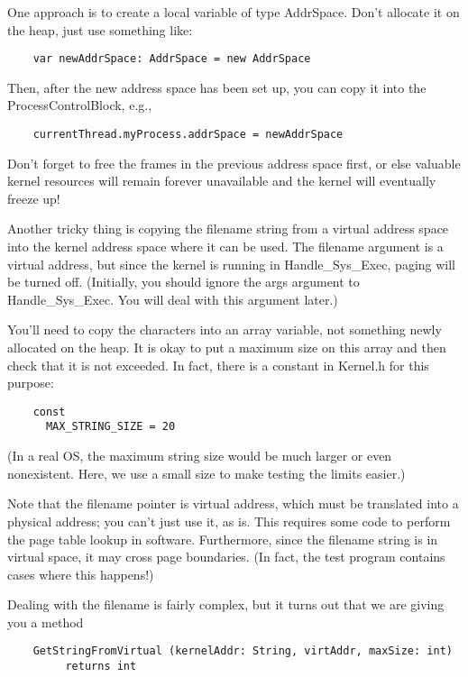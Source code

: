 \documentclass[12pt]{article}
\begin{document}
One approach is to create a local variable of type AddrSpace.  Don't
allocate it on the heap, just use something like:

\begin{verbatim}
    var newAddrSpace: AddrSpace = new AddrSpace
\end{verbatim}

Then, after the new address space has been set up, you can copy it
into the ProcessControlBlock, e.g.,

\begin{verbatim}
    currentThread.myProcess.addrSpace = newAddrSpace
\end{verbatim}

Don't forget to free the frames in the previous address space first,
or else valuable kernel resources will remain forever unavailable and
the kernel will eventually freeze up!

Another tricky thing is copying the filename string from a virtual
address space into the kernel address space where it can be used.  The
filename argument is a virtual address, but since the kernel is
running in Handle\_Sys\_Exec, paging will be turned off.  (Initially,
you should ignore the args argument to Handle\_Sys\_Exec.  You will
deal with this argument later.)

You'll need to copy the characters into an array variable, not
something newly allocated on the heap.  It is okay to put a maximum
size on this array and then check that it is not exceeded.  In fact,
there is a constant in Kernel.h for this purpose:

\begin{verbatim}
    const
      MAX_STRING_SIZE = 20
\end{verbatim}

(In a real OS, the maximum string size would be much larger or even
nonexistent.  Here, we use a small size to make testing the limits
easier.)

Note that the filename pointer is virtual address, which must be
translated into a physical address; you can't just use it, as is.
This requires some code to perform the page table lookup in software.
Furthermore, since the filename string is in virtual space, it may
cross page boundaries.  (In fact, the test program contains cases
where this happens!)

Dealing with the filename is fairly complex, but it turns out that we
are giving you a method

\begin{verbatim}
    GetStringFromVirtual (kernelAddr: String, virtAddr, maxSize: int)
         returns int
\end{verbatim}
\end{document}
